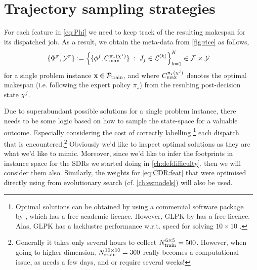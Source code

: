 \section{Trajectory sampling strategies}\label{sec:trdat:tracks}
For each feature in \cref{eq:Phi} we need to keep track of the resulting 
makespan for its dispatched job. 
As a result, we obtain the meta-data from 
\cref{fig:rice} as follows, 
\begin{equation}\label{eq:trdat:metadata}
\{\Phi^\pi,\mathcal{Y}^\pi\} := 
\condset{\{ \vphi^j, C_{\max}^{\pi_\star(\vchi^j)}
    \}}{J_j\in\mathcal{L}^{(k)}}_{k=1}^K \in \mathcal{F} \times \mathcal{Y}
\end{equation}
for a single problem instance $\mathbf{x}\in\mathcal{P}_{\text{train}}$, and where 
$C_{\max}^{\pi_\star({\mathbf{\chi}}^j)}$ denotes the optimal makespan (i.e. following 
the expert policy $\pi_\star$) from the resulting post-decision state ${\mathbf{\chi}}^j$.

Due to superabundant possible solutions for a single problem instance, 
there needs to be some logic based on how to sample the state-space for a 
valuable outcome. Especially considering the cost of correctly labelling 
\footnote{Optimal solutions can be obtained by using a commercial software 
    package by \citet{gurobi}, which has a free academic licence. However, GLPK 
    by \citet{glpk} has a free licence. Alas, GLPK has a lacklustre performance 
    w.r.t. speed for solving $10\times10$ \JSP.}
each dispatch that is encountered.\footnote{Generally it takes 
    only several hours to collect $N_{\text{train}}^{6\times5}=500$. However, when 
    going to higher dimension, $N_{\text{train}}^{10\times10}=300$ 
    really becomes a computational issue, as  needs a few days, 
    and  or  require several weeks!}
Obviously we'd like to inspect optimal solutions as they are what we'd like to 
mimic. Moreover, since we'd like to infer the footprints in instance space for 
the SDRs we started doing in \cref{ch:defdifficulty}, then we will consider 
them also.
Similarly, the weights for \cref{eq:CDR:feat} that were optimised directly 
using from evolutionary search (cf. \cref{ch:esmodels}) will also be used.

